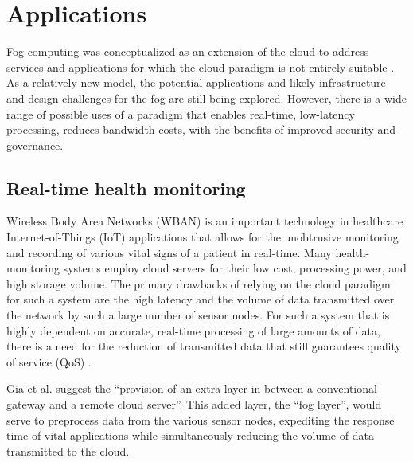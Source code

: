 \documentclass{article}
\begin{document}
\pagebreak

\section{Applications}

Fog computing was conceptualized as an extension of the cloud to address services and applications for which the cloud paradigm is not entirely suitable \cite{bessis2014big}. As a relatively new model, the potential applications and likely infrastructure and design challenges for the fog are still being explored. However, there is a wide range of possible uses of a paradigm that enables real-time, low-latency processing, reduces bandwidth costs, with the benefits of improved security and governance.

\subsection{Real-time health monitoring}
Wireless Body Area Networks (WBAN) is an important technology in healthcare Internet-of-Things (IoT) applications that allows for the unobtrusive monitoring and recording of various vital signs of a patient in real-time. Many health-monitoring systems employ cloud servers for their low cost, processing power, and high storage volume. The primary drawbacks of relying on the cloud paradigm for such a system are the high latency and the volume of data transmitted over the network by such a large number of sensor nodes. For such a system that is highly dependent on accurate, real-time processing of large amounts of data, there is a need for the reduction of transmitted data that still guarantees quality of service (QoS) \cite{gia2015fog}.

Gia et al. \cite{gia2015fog} suggest the ``provision of an extra layer in between a conventional gateway and a remote cloud server''. This added layer, the ``fog layer'', would serve to preprocess data from the various sensor nodes, expediting the response time of vital applications while simultaneously reducing the volume of data transmitted to the cloud.
\end{document}
